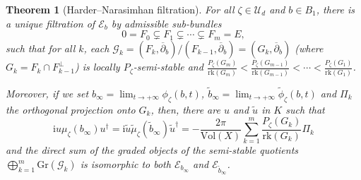 \documentclass{article}
\newtheorem{theorem}{Theorem}[section]
\theoremstyle{remark}
\theoremstyle{definition}
\newcommand{\rk}{\mathrm{rk}}
\newcommand{\Vol}{\mathrm{Vol}}
\renewcommand{\i}{\boldsymbol{\mathrm{i}}}
\newcommand{\E}{\mathcal{E}}
\newcommand{\G}{\mathcal{G}}
\newcommand{\mU}{\mathcal{U}}
\newcommand{\dbar}{\overline{\partial}}
\begin{document}
\begin{theorem}[Harder--Narasimhan filtration]\label{THE:FHN admissible}
    For all $\zeta \in \mU_d$ and $b \in B_1$, there is a unique filtration of $\E_b$ by admissible sub-bundles
    $$
    0 = F_0 \subsetneq F_1 \subsetneq \cdots \subsetneq F_m = E,
    $$
    such that for all $k$, each $\G_k = (F_k,\dbar_b)/(F_{k - 1},\dbar_b) = (G_k,\dbar_b)$ (where $G_k = F_k \cap F_{k - 1}^\bot$) is locally $P_\zeta$-semi-stable and $\frac{P_\zeta(G_m)}{\rk(G_m)} < \frac{P_\zeta(G_{m - 1})}{\rk(G_{m - 1})} < \cdots < \frac{P_\zeta(G_1)}{\rk(G_1)}$.
    
    Moreover, if we set $b_\infty = \lim_{t \rightarrow +\infty} \phi_\zeta(b,t)$, $\tilde{b}_\infty = \lim_{t \rightarrow +\infty} \tilde{\phi}_\zeta(b,t)$ and $\Pi_k$ the orthogonal projection onto $G_k$, then, there are $u$ and $\tilde{u}$ in $K$ such that
    $$
    \i u\mu_\zeta(b_\infty)u^\dagger = \i\tilde{u}\tilde{\mu}_\zeta(\tilde{b}_\infty)\tilde{u}^\dagger = -\frac{2\pi}{\Vol(X)}\sum_{k = 1}^m \frac{P_\zeta(G_k)}{\rk(G_k)}\Pi_k
    $$
    and the direct sum of the graded objects of the semi-stable quotients $\bigoplus_{k = 1}^m \mathrm{Gr}(\G_k)$ is isomorphic to both $\E_{b_\infty}$ and $\E_{\tilde{b}_\infty}$.
\end{theorem}
\end{document}
